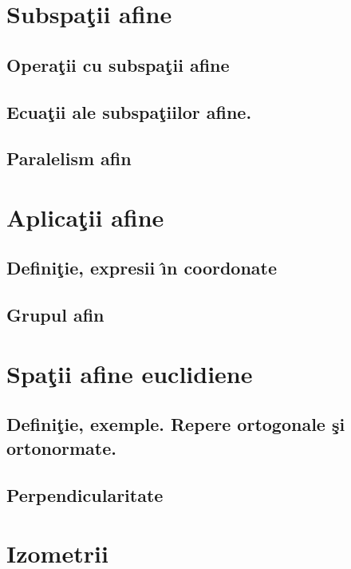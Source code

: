 \documentclass[12pt]{book}
\begin{document}
\section{Subspa\c tii afine}
\subsection{Opera\c tii cu subspa\c tii afine}
\subsection{Ecua\c tii ale subspa\c tiilor afine.}
\subsection{Paralelism afin}













\section{Aplica\c tii afine}
\subsection{Defini\c tie, expresii \^{\i}n coordonate}
\subsection{Grupul afin}

\section{Spa\c tii afine euclidiene}

\subsection{Defini\c tie, exemple. Repere ortogonale \c si ortonormate.}
\subsection{Perpendicularitate}

\section{Izometrii}
\end{document}
